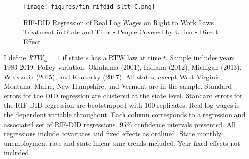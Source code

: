 \documentclass[11pt]{article}
\begin{document}
{\pagebreak
\begin{landscape}
\begin{figure}[ht!]
\centering
    \caption{RIF-DID Regression of Real Log Wages on Right to Work Laws Treatment in State and Time - People Covered by Union - Direct Effect}\label{fig:rifdid-sltt-C}
    \texttt{[image: figures/fin\_rifdid-sltt-C.png]}
\end{figure}
\footnotesize{I define $RTW_{st} = 1$ if state $s$ has a RTW law at time $t$. Sample includes years 1983-2019. Policy variation: Oklahoma (2001), Indiana (2012), Michigan (2013), Wisconsin (2015), and Kentucky (2017). All states, except West Virginia, Montana, Maine, New Hampshire, and Vermont are in the sample. Standard errors for the DID regression are clustered at the state level. Standard errors for the RIF-DID regression are bootstrapped with 100 replicates. Real log wages is the dependent variable throughout. Each column corresponds to a regression and associated set of RIF-DID regressions. 95\% confidence intervals presented. All regressions include covariates and fixed effects as outlined. State monthly unemployment rate and state linear time trends included. Year fixed effects not included.}
\end{landscape}

}
\end{document}
